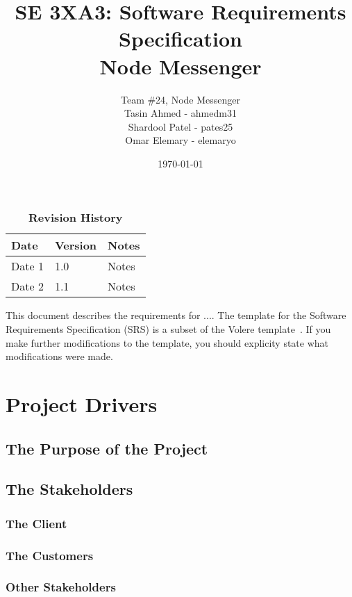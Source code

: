 \documentclass[12pt, titlepage]{article}
\title{SE 3XA3: Software Requirements Specification\\Node Messenger}
\author{Team \#24, Node Messenger
		\\ Tasin Ahmed - ahmedm31
		\\ Shardool Patel - pates25
		\\ Omar Elemary - elemaryo
}
\date{\today}
\begin{document}
    \maketitle

    \tableofcontents
    \listoftables
    \listoffigures

    \begin{table}[bp]
    \caption{\bf Revision History}
    \begin{tabularx}{\textwidth}{p{3cm}p{2cm}X}
    \toprule {\bf Date} & {\bf Version} & {\bf Notes}\\
    \midrule
    Date 1 & 1.0 & Notes\\
    Date 2 & 1.1 & Notes\\
    \bottomrule
    \end{tabularx}
    \end{table}

    \newpage


    This document describes the requirements for ....  The template for the Software
    Requirements Specification (SRS) is a subset of the Volere
    template~\citep{RobertsonAndRobertson2012}.  If you make further modifications
    to the template, you should explicity state what modifications were made.

    \section{Project Drivers}

    	\subsection{The Purpose of the Project}

    	\subsection{The Stakeholders}

    		\subsubsection{The Client}

    		\subsubsection{The Customers}

    		\subsubsection{Other Stakeholders}
\end{document}

